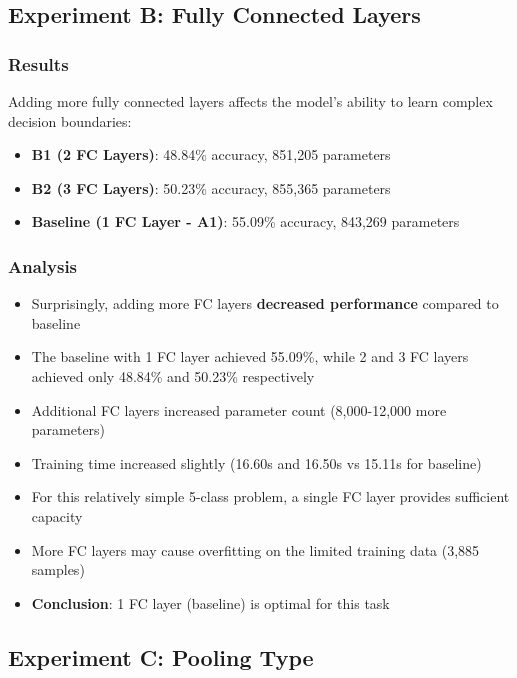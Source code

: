 \documentclass[12pt,a4paper]{article}
\begin{document}
\subsection{Experiment B: Fully Connected Layers}

\subsubsection{Results}
Adding more fully connected layers affects the model's ability to learn complex decision boundaries:

\begin{itemize}
    \item \textbf{B1 (2 FC Layers)}: 48.84\% accuracy, 851,205 parameters
    \item \textbf{B2 (3 FC Layers)}: 50.23\% accuracy, 855,365 parameters
    \item \textbf{Baseline (1 FC Layer - A1)}: 55.09\% accuracy, 843,269 parameters
\end{itemize}

\subsubsection{Analysis}
\begin{itemize}
    \item Surprisingly, adding more FC layers \textbf{decreased performance} compared to baseline
    \item The baseline with 1 FC layer achieved 55.09\%, while 2 and 3 FC layers achieved only 48.84\% and 50.23\% respectively
    \item Additional FC layers increased parameter count (8,000-12,000 more parameters)
    \item Training time increased slightly (16.60s and 16.50s vs 15.11s for baseline)
    \item For this relatively simple 5-class problem, a single FC layer provides sufficient capacity
    \item More FC layers may cause overfitting on the limited training data (3,885 samples)
    \item \textbf{Conclusion}: 1 FC layer (baseline) is optimal for this task
\end{itemize}

\subsection{Experiment C: Pooling Type}
\end{document}
